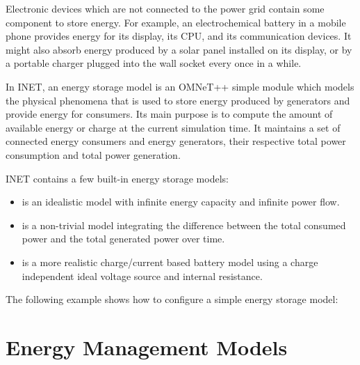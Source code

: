 Electronic devices which are not connected to the power grid contain some
component to store energy. For example, an electrochemical battery in a
mobile phone provides energy for its display, its CPU, and its
communication devices. It might also absorb energy produced by a solar
panel installed on its display, or by a portable charger plugged into the
wall socket every once in a while.

In INET, an energy storage model is an OMNeT++ simple module which models
the physical phenomena that is used to store energy produced by generators
and provide energy for consumers. Its main purpose is to compute the amount
of available energy or charge at the current simulation time. It maintains
a set of connected energy consumers and energy generators, their respective
total power consumption and total power generation.

INET contains a few built-in energy storage models:

\begin{itemize}
        \item {} is an idealistic model with infinite energy capacity and infinite power flow.
        \item {} is a non-trivial model integrating the difference between the total consumed power and the total generated power over time.
        \item {} is a more realistic charge/current based battery model using a charge independent ideal voltage source and internal resistance.
\end{itemize}

The following example shows how to configure a simple energy storage model:


\section{Energy Management Models}







